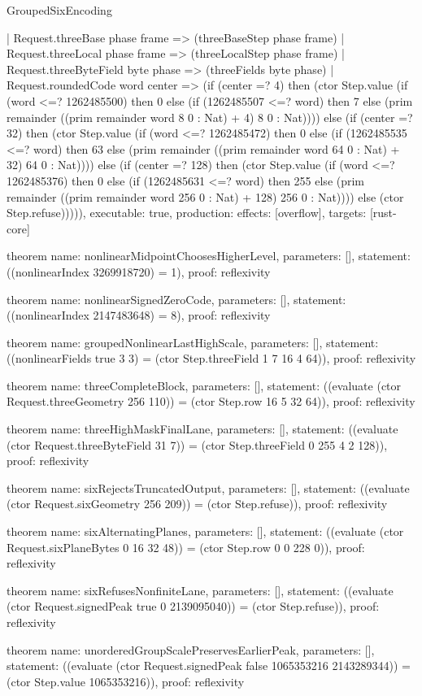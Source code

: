 \begin{lexlean}{GroupedSixEncoding}
\begin{semanticmodule}
{    | Request.threeBase phase frame => (threeBaseStep phase frame)
    | Request.threeLocal phase frame => (threeLocalStep phase frame)
    | Request.threeByteField byte phase => (threeFields byte phase)
    | Request.roundedCode word center => (if (center =? 4) then (ctor Step.value (if (word <=? 1262485500) then 0 else (if (1262485507 <=? word) then 7 else (prim remainder ((prim remainder word 8 0 : Nat) + 4) 8 0 : Nat)))) else (if (center =? 32) then (ctor Step.value (if (word <=? 1262485472) then 0 else (if (1262485535 <=? word) then 63 else (prim remainder ((prim remainder word 64 0 : Nat) + 32) 64 0 : Nat)))) else (if (center =? 128) then (ctor Step.value (if (word <=? 1262485376) then 0 else (if (1262485631 <=? word) then 255 else (prim remainder ((prim remainder word 256 0 : Nat) + 128) 256 0 : Nat)))) else (ctor Step.refuse))))),
  executable: true,
  production: {effects: [overflow], targets: [rust-core]}
}

theorem{
  name: nonlinearMidpointChoosesHigherLevel,
  parameters: [],
  statement: ((nonlinearIndex 3269918720) = 1),
  proof: reflexivity{}
}

theorem{
  name: nonlinearSignedZeroCode,
  parameters: [],
  statement: ((nonlinearIndex 2147483648) = 8),
  proof: reflexivity{}
}

theorem{
  name: groupedNonlinearLastHighScale,
  parameters: [],
  statement: ((nonlinearFields true 3 3) = (ctor Step.threeField 1 7 16 4 64)),
  proof: reflexivity{}
}

theorem{
  name: threeCompleteBlock,
  parameters: [],
  statement: ((evaluate (ctor Request.threeGeometry 256 110)) = (ctor Step.row 16 5 32 64)),
  proof: reflexivity{}
}

theorem{
  name: threeHighMaskFinalLane,
  parameters: [],
  statement: ((evaluate (ctor Request.threeByteField 31 7)) = (ctor Step.threeField 0 255 4 2 128)),
  proof: reflexivity{}
}

theorem{
  name: sixRejectsTruncatedOutput,
  parameters: [],
  statement: ((evaluate (ctor Request.sixGeometry 256 209)) = (ctor Step.refuse)),
  proof: reflexivity{}
}

theorem{
  name: sixAlternatingPlanes,
  parameters: [],
  statement: ((evaluate (ctor Request.sixPlaneBytes 0 16 32 48)) = (ctor Step.row 0 0 228 0)),
  proof: reflexivity{}
}

theorem{
  name: sixRefusesNonfiniteLane,
  parameters: [],
  statement: ((evaluate (ctor Request.signedPeak true 0 2139095040)) = (ctor Step.refuse)),
  proof: reflexivity{}
}

theorem{
  name: unorderedGroupScalePreservesEarlierPeak,
  parameters: [],
  statement: ((evaluate (ctor Request.signedPeak false 1065353216 2143289344)) = (ctor Step.value 1065353216)),
  proof: reflexivity{}
}
\end{semanticmodule}
\end{lexlean}
